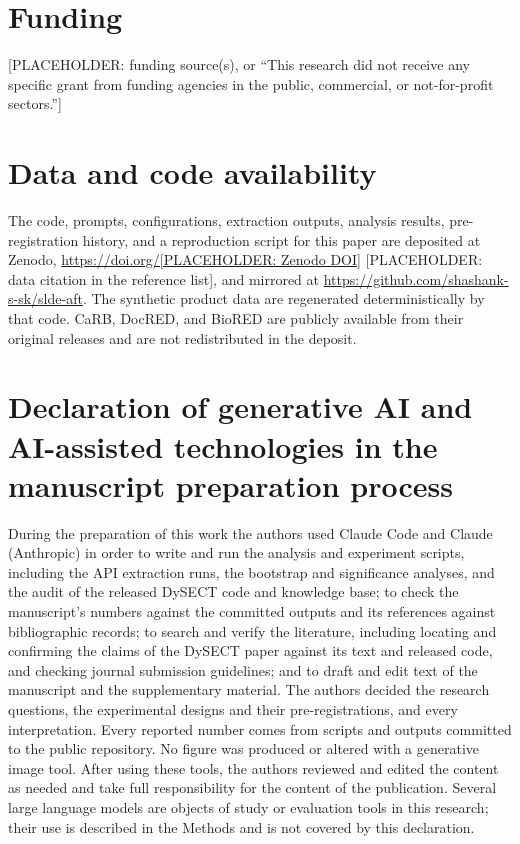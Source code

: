 \documentclass[preprint,12pt,authoryear]{elsarticle}
\begin{document}
\section*{Funding}
[PLACEHOLDER: funding source(s), or ``This research did not receive any
specific grant from funding agencies in the public, commercial, or
not-for-profit sectors.'']

\section*{Data and code availability}
The code, prompts, configurations, extraction outputs, analysis results,
pre-registration history, and a reproduction script for this paper are
deposited at Zenodo, \url{https://doi.org/[PLACEHOLDER: Zenodo DOI]}
[PLACEHOLDER: data citation in the reference list], and mirrored at
\url{https://github.com/shashank-s-sk/slde-aft}. The synthetic product
data are regenerated deterministically by that code. CaRB, DocRED, and
BioRED are publicly available from their original releases and are not
redistributed in the deposit.

\section*{Declaration of generative AI and AI-assisted technologies in the manuscript preparation process}
During the preparation of this work the authors used Claude Code and
Claude (Anthropic) in order to write and run the analysis and experiment
scripts, including the API extraction runs, the bootstrap and
significance analyses, and the audit of the released DySECT code and
knowledge base; to check the manuscript's numbers against the committed
outputs and its references against bibliographic records; to search and
verify the literature, including locating and confirming the claims of
the DySECT paper against its text and released code, and checking
journal submission guidelines; and to draft and edit text of the
manuscript and the supplementary material. The authors decided the
research questions, the experimental designs and their
pre-registrations, and every interpretation. Every reported number comes
from scripts and outputs committed to the public repository. No figure
was produced or altered with a generative image tool. After using these
tools, the authors reviewed and edited the content as needed and take
full responsibility for the content of the publication. Several large
language models are objects of study or evaluation tools in this
research; their use is described in the Methods and is not covered by
this declaration.



\end{document}
